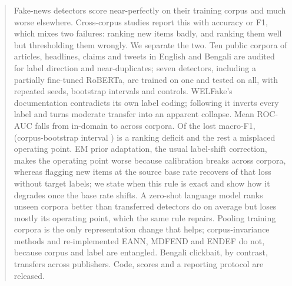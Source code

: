 \begin{abstract}
Fake-news detectors score near-perfectly on their training corpus and much worse elsewhere. Cross-corpus studies report this with accuracy or F1, which mixes two failures: ranking new items badly, and ranking them well but thresholding them wrongly. We separate the two. Ten public corpora of articles, headlines, claims and tweets in English and Bengali are audited for label direction and near-duplicates; seven detectors, including a partially fine-tuned RoBERTa, are trained on one and tested on all, with repeated seeds, bootstrap intervals and controls. WELFake's documentation contradicts its own label coding; following it inverts every label and turns moderate transfer into an apparent collapse. Mean ROC-AUC falls from \InAUC{} in-domain to \OffAUC{} across corpora. Of the lost macro-F1, \RankShareAll{} (corpus-bootstrap interval \RankShareCI) is a ranking deficit and the rest a misplaced operating point. EM prior adaptation, the usual label-shift correction, makes the operating point worse because calibration breaks across corpora, whereas flagging new items at the source base rate recovers \RecRank{} of that loss without target labels; we state when this rule is exact and show how it degrades once the base rate shifts. A zero-shot language model ranks unseen corpora better than transferred detectors do on average but loses mostly its operating point, which the same rule repairs. Pooling training corpora is the only representation change that helps; corpus-invariance methods and re-implemented EANN, MDFEND and ENDEF do not, because corpus and label are entangled. Bengali clickbait, by contrast, transfers across publishers. Code, scores and a reporting protocol are released.
\end{abstract}
